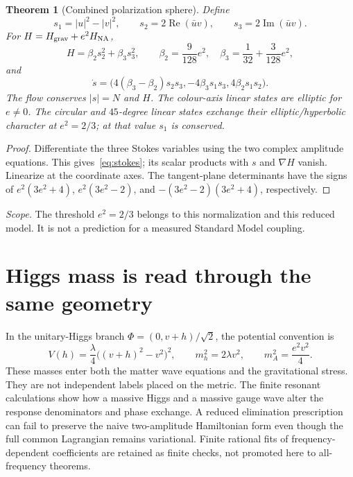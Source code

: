 \documentclass[11pt,a4paper,oneside]{book}
\theoremstyle{plain}
\newtheorem{theorem}{Theorem}[chapter]
\theoremstyle{definition}
\theoremstyle{remark}
\newcommand{\src}[2]{\cite{#1}}
\newcommand{\scope}[1]{\par\smallskip\noindent\textit{Scope.} #1\par\smallskip}
\begin{document}
\begin{theorem}[Combined polarization sphere]
\label{thm:stokes}
Define
\begin{equation}
 s_1=|u|^2-|v|^2,\qquad
 s_2=2\operatorname{Re}(\bar uv),\qquad
 s_3=2\operatorname{Im}(\bar uv).
\end{equation}
For $H=H_{\rm grav}+e^2H_{\rm NA}$,
\begin{equation}
 H=\beta_2s_2^2+\beta_3s_3^2,
 \qquad\beta_2=\frac9{128}e^2,\quad
 \beta_3=\frac1{32}+\frac3{128}e^2,
\end{equation}
and
\begin{equation}
 \dot s=\bigl(4(\beta_3-\beta_2)s_2s_3,
 -4\beta_3s_1s_3,4\beta_2s_1s_2\bigr).
 \label{eq:stokes}
\end{equation}
The flow conserves $|s|=N$ and $H$. The colour-axis linear states are elliptic for $e\ne0$. The circular and $45$-degree linear states exchange their elliptic/hyperbolic character at $e^2=2/3$; at that value $s_1$ is conserved.
\end{theorem}
\begin{proof}
Differentiate the three Stokes variables using the two complex amplitude equations. This gives~\eqref{eq:stokes}; its scalar products with $s$ and $\nabla H$ vanish. Linearize at the coordinate axes. The tangent-plane determinants have the signs of $e^2(3e^2+4)$, $e^2(3e^2-2)$, and $-(3e^2-2)(3e^2+4)$, respectively.
\end{proof}
\src{R20}{thm:v20v9-stokes}
\scope{The threshold $e^2=2/3$ belongs to this normalization and this reduced model. It is not a prediction for a measured Standard Model coupling.}

\section{Higgs mass is read through the same geometry}
In the unitary-Higgs branch $\Phi=(0,v+h)/\sqrt2$, the potential convention is
\begin{equation}
 V(h)=\frac\lambda4\bigl((v+h)^2-v^2\bigr)^2,
 \qquad m_h^2=2\lambda v^2,
 \qquad m_A^2=\frac{e^2v^2}{4}.
 \label{eq:toy-higgs-masses}
\end{equation}
These masses enter both the matter wave equations and the gravitational stress. They are not independent labels placed on the metric. The finite resonant calculations show how a massive Higgs and a massive gauge wave alter the response denominators and phase exchange. A reduced elimination prescription can fail to preserve the naive two-amplitude Hamiltonian form even though the full common Lagrangian remains variational. Finite rational fits of frequency-dependent coefficients are retained as finite checks, not promoted here to all-frequency theorems. \cite{R20}
\end{document}
